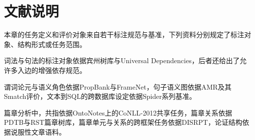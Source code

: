 






\section*{文献说明}

本章的任务定义和评价对象来自若干标注规范与基准，下列资料分别规定了标注对象、结构形式或任务范围。

词法与句法的标注对象依据宾州树库与Universal Dependencies，后者还给出了允许多入边的增强依存规范。

\begin{fullwidth}
\raggedright
{}\par
{}\par
{}
\end{fullwidth}

谓词论元与语义角色依据PropBank与FrameNet，句子语义图依据AMR及其Smatch评价，文本到SQL的跨数据库设定依据Spider系列基准。

\begin{fullwidth}
\raggedright
\small
{}\par\medskip
{}\par\medskip
{}\par\medskip
{}\par\medskip
{}\par\medskip
{}\par\medskip
{}\par\medskip
{}
\end{fullwidth}

篇章分析中，共指依据OntoNotes上的CoNLL-2012共享任务，篇章关系依据PDTB与RST篇章树库，篇章单元与关系的跨框架任务依据DISRPT，论证结构依据说服性文章语料。

